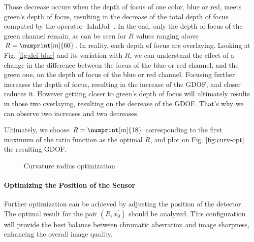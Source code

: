 \documentclass[10pt,letterpaper]{article}
\begin{document}
Those decrease occurs when the depth of focus of one color, blue or red, meets green's depth of focus, resulting in the decrease of the total depth of focus computed by the operator $\operatorname{IsInDoF}$. In the end, only the depth of focus of the green channel remain, as can be seen for $R$ values ranging above $R = \numprint[m]{60}$. In reality, each depth of focus are overlaying. Looking at Fig. \ref{fig:def-blur} and its variation with $R$, we can understand the effect of a change in the difference between the focus of the blue or red channel, and the green one, on the depth of focus of the blue or red channel. Focusing further increases the depth of focus, resulting in the increase of the GDOF, and closer reduces it. However getting closer to green's depth of focus will ultimately results in those two overlaying, resulting on the decrease of the GDOF. That's why we can observe two increases and two decreases.

Ultimately, we choose $R = \numprint[m]{18}$ corresponding to the first maximum of the ratio function as the optimal $R$, and plot on Fig. \ref{fig:curv-opt} the resulting GDOF.

\begin{figure}[h]
    \centering
	\caption{Curvature radius optimization}
\end{figure}

\paragraph{Optimizing the Position of the Sensor}
Further optimization can be achieved by adjusting the position of the detector. The optimal result for the pair \((R, x_0^{\prime})\) should be analyzed. This configuration will provide the best balance between chromatic aberration and image sharpness, enhancing the overall image quality.
\end{document}
